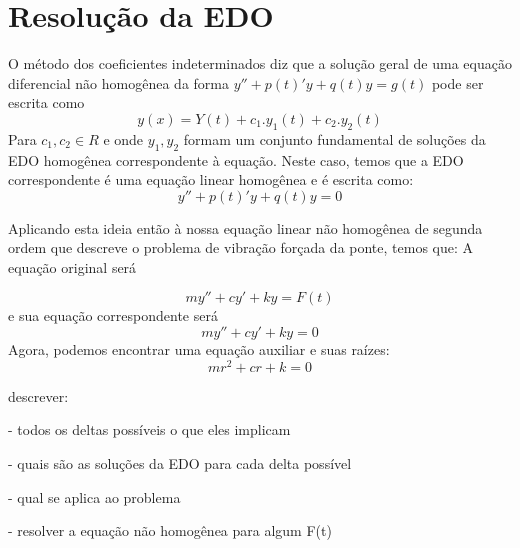 \documentclass[]{article}
\begin{document}
\pagebreak 
\section{Resolução da EDO}
O método dos coeficientes indeterminados diz que a solução geral de uma equação diferencial não homogênea
da forma $y'' + p(t)'y + q(t)y = g(t)$ pode ser escrita como
\[ y(x) = Y(t) + c_1.y_1(t) + c_2.y_2(t)\] 
Para $c_1, c_2 \in R$ e onde ${y_1,y_2}$ formam um conjunto fundamental de soluções
da EDO homogênea correspondente à equação. Neste caso, temos que a EDO correspondente é uma equação
linear homogênea e é escrita como: 
\[y'' + p(t)'y + q(t)y = 0\] 

Aplicando esta ideia então à nossa equação linear não homogênea de segunda ordem que descreve o problema 
de vibração forçada da ponte, temos que:
A equação original será 

\[  my'' + cy'  + ky = F(t)\] 
e sua equação correspondente será
\[ my'' + cy'  + ky = 0\]
Agora, podemos encontrar uma equação auxiliar e suas raízes:
\[ mr^2 + cr  + k = 0\] 

\vspace*{0.8cm}
descrever:

- todos os deltas possíveis o que eles implicam

- quais são as soluções da EDO para cada delta possível

- qual se aplica ao problema

- resolver a equação não homogênea para algum F(t)
\end{document}
